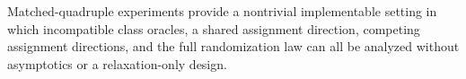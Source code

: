 Matched-quadruple experiments provide a nontrivial implementable setting in which incompatible class oracles, a shared assignment direction, competing assignment directions, and the full randomization law can all be analyzed without asymptotics or a relaxation-only design.